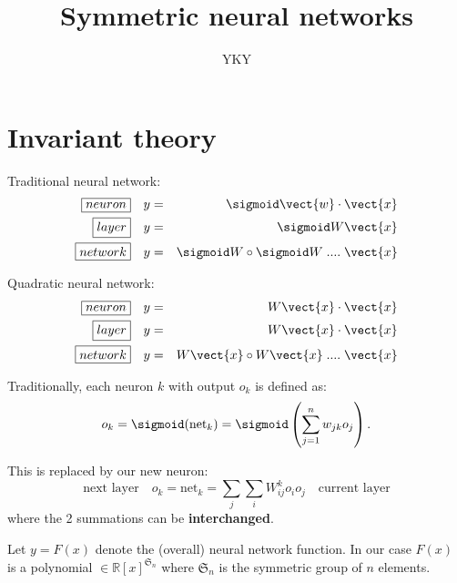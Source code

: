 

\usepackage{xeCJK}
\usepackage{color}

\usepackage{mathtools}

\title{Symmetric neural networks}
\author{YKY}


\maketitle

\section{Invariant theory}

Traditional neural network:
\begin{eqnarray}
\boxed{neuron} \quad & y = & \sigmoid \vect{w} \cdot \vect{x} \nonumber \\
\boxed{layer} \quad & y = & \sigmoid W \vect{x} \nonumber \\
\boxed{network} \quad & y = & \sigmoid W \circ \sigmoid W \; .... \; \vect{x} 
\end{eqnarray}

Quadratic neural network:
\begin{eqnarray}
\boxed{neuron} \quad & y = & W \vect{x} \cdot \vect{x} \nonumber \\
\boxed{layer} \quad & y = & W \vect{x} \cdot \vect{x} \nonumber \\
\boxed{network} \quad & y = & W \vect{x} \circ W \vect{x} \; .... \; \vect{x} 
\end{eqnarray}

Traditionally, each neuron $k$ with output $o_k$ is defined as:
\begin{equation}
o_k = \sigmoid ({\text{net}}_k) = \sigmoid \left(\sum _{j=1}^{n} w_{jk} o_j \right) .
\end{equation}

This is replaced by our new neuron:
\begin{equation}
\boxed{\mbox{next layer}} \quad
o_k = {\text{net}}_k = \sum_j \sum_i W_{ij}^k o_i o_j
\quad \boxed{\mbox{current layer}}
\end{equation}
where the 2 summations can be \textbf{interchanged}.

Let $y = F(x)$ denote the (overall) neural network function.  In our case $F(x)$ is a polynomial $\in \mathbb{R}[x]^{\mathfrak{S}_n}$ where $\mathfrak{S}_n$ is the symmetric group of $n$ elements.

